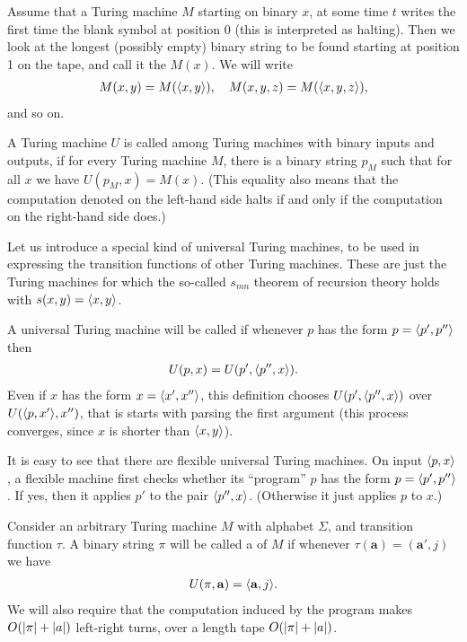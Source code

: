 \documentclass[11pt]{memoir}
\theoremstyle{definition} %
\renewcommand{\vek}[1]{\mathbf{#1}}
\newcommand{\va}{\vek{a}}
\begin{document}
\begin{definition}
 Assume that a Turing machine \( M \) starting on binary \( x \),
 at some time \( t \) writes the first time the blank symbol at position
 0 (this is interpreted as halting).
 Then we look at the longest (possibly empty) binary string to be found starting at position
 1 on the tape, and call it the  \( M(x) \).
We will write
 \begin{align*}
   M(x,y)=M({\mathopen\langle x,y\mathclose\rangle}),\quad M(x,y,z)=M({\mathopen\langle x,y,z\mathclose\rangle}),
 \end{align*}
and so on.

A Turing machine \( U \) is called  among Turing machines with
binary inputs and outputs, if for every Turing machine \( M \),
there is a binary string \( p_{M} \) such that for all \( x \) we have
\( U(p_{M},x)=M(x) \).
(This equality also means that the computation denoted on the left-hand side 
halts if and only if the computation on the right-hand side does.)
\end{definition}

Let us introduce a special kind of universal Turing machines, to be
used in expressing the transition functions of other Turing machines.
These are just the Turing machines for which the so-called \( s_{mn} \) theorem
of recursion theory holds with \( s(x,y)={\mathopen\langle x,y\mathclose\rangle} \).

\begin{definition}\label{def:univ-TM}
A universal Turing machine will be called  if 
whenever \( p \) has the form \( p={\mathopen\langle p',p''\mathclose\rangle} \) then
\begin{align*}
 U(p,x)= U(p',{\mathopen\langle p'',x\mathclose\rangle}).
 \end{align*}
Even if \( x \) has the form \(x ={\mathopen\langle x',x''\mathclose\rangle} \), this definition chooses
\( U(p',{\mathopen\langle p'',x\mathclose\rangle}) \) over \( U({\mathopen\langle p,x'\mathclose\rangle},x'') \), that is starts with 
parsing the first argument
(this process converges, since \( x \) is  shorter than \( {\mathopen\langle x,y\mathclose\rangle} \)).
\end{definition}

It is easy to see that there are flexible universal Turing machines.
On input \( {\mathopen\langle p,x\mathclose\rangle} \),
a flexible machine first checks whether its ``program'' \( p \) 
has the form \( p={\mathopen\langle p',p''\mathclose\rangle} \).
If yes, then it applies \( p' \) to the pair \( {\mathopen\langle p'',x\mathclose\rangle} \).
(Otherwise it just applies \( p \) to \( x \).)

\begin{definition}
  Consider an arbitrary Turing machine \( M \) with alphabet
\( \Sigma \), and transition function \( \tau \).
A binary string \( \pi \) will be called a  of \( M \) if
whenever \( \tau(\va)=(\va',j) \) we have
 \begin{align*}
 U(\pi,\va)=\ang{\va,j}.
 \end{align*}
We will also require that the computation induced by the program makes
\( O(\lvert \pi \rvert+\lvert a \rvert) \) left-right turns, over a length tape \( O(\lvert \pi \rvert+\lvert a \rvert) \).
\end{definition}
\end{document}
